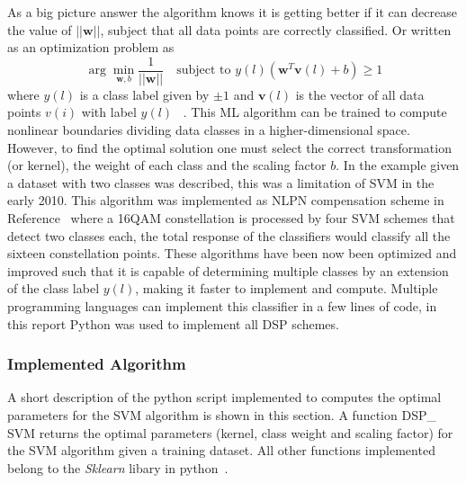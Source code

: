 As a big picture answer the algorithm knows it is getting better if it can decrease the value of $||\textbf{w}||$, subject that all data points are correctly classified. Or written as an optimization problem as
\begin{equation}
\arg\min_{\textbf{w},b}\frac{1}{||\textbf{w}||} \ \ \  \text{   subject to } y(l)(\textbf{w}^{T}\textbf{v}(l)+b)\geq1 
\end{equation}
where $y(l)$ is a class label given by $\pm 1$ and $\textbf{v}(l)$ is the vector of all data points $v(i)$ with label $y(l)$  ~\cite{boser1992training}. This ML algorithm can be trained to compute nonlinear boundaries dividing data classes in a higher-dimensional space. However, to find the optimal solution one must select the correct transformation (or kernel), the weight of each class and the scaling factor $b$. In the example given a dataset with two classes was described, this was a limitation of SVM in the early 2010. This algorithm  was implemented as NLPN compensation scheme in Reference~\cite{Nonparameter} where a 16QAM constellation is processed by four SVM schemes that detect two classes each, the total response of the classifiers would classify all the sixteen constellation points. These algorithms have been now been optimized and improved such that it is capable of determining multiple classes by an extension of the class label $y(l)$, making it faster to implement and compute. Multiple programming languages can implement this classifier in a few lines of code, in this report Python was used to implement all DSP schemes.
\subsubsection{Implemented Algorithm}

A short description of the python script implemented to computes the optimal parameters for the SVM algorithm is shown in this section. A function DSP\_ SVM returns the optimal parameters (kernel, class weight and scaling factor) for the SVM algorithm given a training dataset. All other functions implemented belong to the \textit{Sklearn} libary in python~\cite{scikit-learn}.


